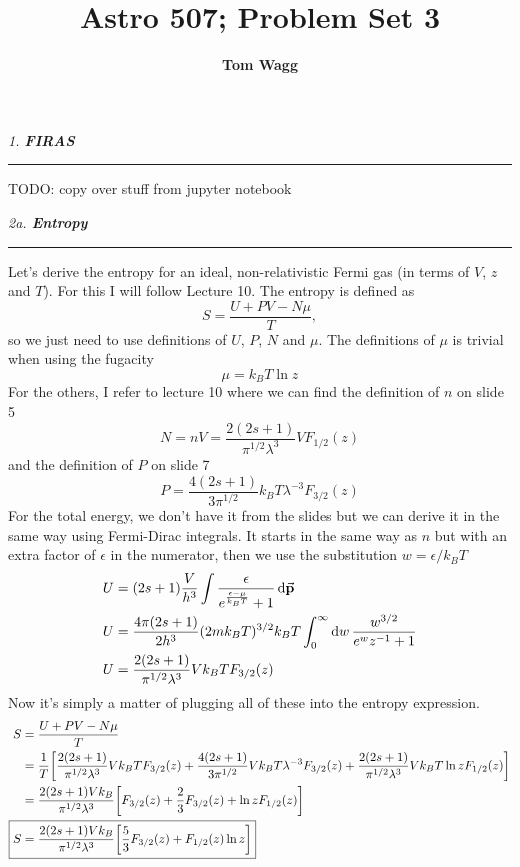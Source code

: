 \documentclass[12pt, letterpaper, twoside]{article}
\title{Astro 507; Problem Set 3}
\author{\textbf{Tom Wagg}}
\newcommand{\question}[1]{{\noindent \it #1}}
\newcommand{\answer}[1]{
    \par\noindent\rule{\textwidth}{0.4pt}#1\vspace{0.5cm}
}
\newcommand{\todo}[1]{{\color{red}\begin{center}TODO: #1\end{center}}}
\begin{document}
\maketitle

\question{1. \textbf{FIRAS}}
\answer{
    \todo{copy over stuff from jupyter notebook}
}

\question{2a. \textbf{Entropy}}
\answer{
    Let's derive the entropy for an ideal, non-relativistic Fermi gas (in terms of $V$, $z$ and $T$). For this I will follow Lecture 10. The entropy is defined as
    \begin{equation}
        S = \frac{U + PV - N \mu}{T},
    \end{equation}
    so we just need to use definitions of $U$, $P$, $N$ and $\mu$. The definitions of $\mu$ is trivial when using the fugacity
    \begin{equation}
        \mu = k_B T \ln z
    \end{equation}
    For the others, I refer to lecture 10 where we can find the definition of $n$ on slide 5
    \begin{equation}
        N = n V = \frac{2(2s + 1)}{\pi^{1/2} \lambda^3} V F_{1/2}(z)
    \end{equation}
    and the definition of $P$ on slide 7
    \begin{equation}
        P = \frac{4(2s + 1)}{3 \pi^{1/2}} k_B T \lambda^{-3} F_{3/2}(z)
    \end{equation}
    For the total energy, we don't have it from the slides but we can derive it in the same way using Fermi-Dirac integrals. It starts in the same way as $n$ but with an extra factor of $\epsilon$ in the numerator, then we use the substitution $w = \epsilon / k_B T$
    \begin{align}
        U &= (2s + 1) \frac{V}{h^3} \int \frac{\epsilon}{e^{\frac{\epsilon - \mu}{k_B T}} + 1} \dd{\va{p}} \\
        U &= \frac{4\pi (2s + 1)}{2 h^3} (2 m k_B T)^{3/2} k_B T \int_0^\infty \dd{w} \frac{w^{3/2}}{e^w z^{-1} + 1} \\
        U &= \frac{2(2s + 1)}{\pi^{1/2} \lambda^3} V k_B T F_{3/2}(z)
    \end{align}
    Now it's simply a matter of plugging all of these into the entropy expression.
    \begin{align}
        S &= \frac{U + PV - N \mu}{T} \\
          &= \frac{1}{T} \qty[ \frac{2(2s + 1)}{\pi^{1/2} \lambda^3} V k_B T F_{3/2}(z) + \frac{4(2s + 1)}{3 \pi^{1/2}} V k_B T \lambda^{-3} F_{3/2}(z) + \frac{2(2s + 1)}{\pi^{1/2} \lambda^3} V k_B T \ln z F_{1/2}(z)] \\
          &= \frac{2(2s + 1) V k_B}{\pi^{1/2} \lambda^3} \qty[ F_{3/2}(z) + \frac{2}{3} F_{3/2}(z) + \ln z F_{1/2}(z)] \\
        \Aboxed{ S &= \frac{2(2s + 1) V k_B}{\pi^{1/2} \lambda^3} \qty[ \frac{5}{3} F_{3/2}(z) + F_{1/2}(z) \ln z] }
    \end{align}
}
\end{document}
